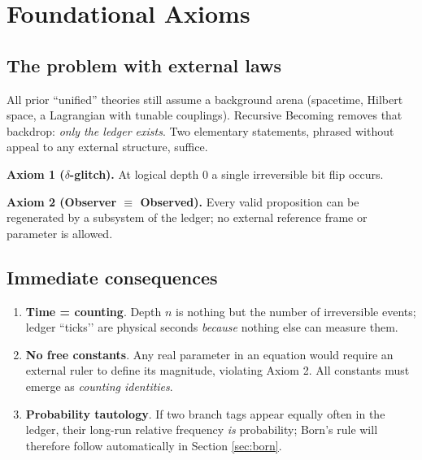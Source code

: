 \section{Foundational Axioms}
\label{sec:axioms}

\subsection{The problem with external laws}

All prior “unified” theories still assume a background arena
(spacetime, Hilbert space, a Lagrangian with tunable couplings).
Recursive Becoming removes that backdrop: \emph{only the ledger
exists}.  Two elementary statements, phrased without appeal to any
external structure, suffice.

\begin{axiombox}
\textbf{Axiom 1 ($\delta$-glitch).}  
At logical depth 0 a single irreversible bit flip occurs.
\end{axiombox}

\begin{axiombox}
\textbf{Axiom 2 (Observer $\boldsymbol{\equiv}$ Observed).}  
Every valid proposition can be regenerated by a subsystem of the
ledger; no external reference frame or parameter is allowed.
\end{axiombox}

\subsection{Immediate consequences}

\begin{enumerate}
  \item \textbf{Time = counting}.  Depth $n$ is nothing but the number
        of irreversible events; ledger “ticks’’ are physical seconds
        \emph{because} nothing else can measure them.
  \item \textbf{No free constants}.  Any real parameter in an equation
        would require an external ruler to define its magnitude,
        violating Axiom 2.  All constants must emerge as
        \emph{counting identities}.
  \item \textbf{Probability tautology}.  If two branch tags appear
        equally often in the ledger, their long-run relative frequency
        \emph{is} probability; Born's rule will therefore follow
        automatically in Section \ref{sec:born}.
\end{enumerate}

